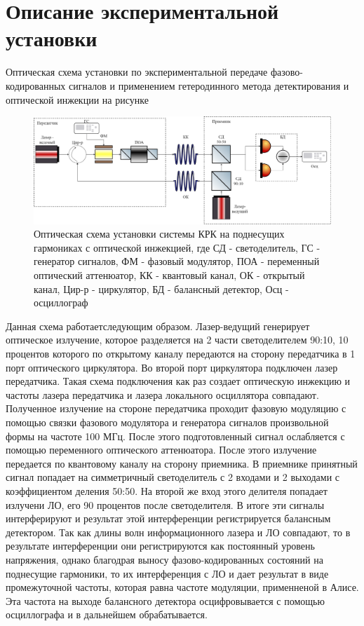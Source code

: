 \section{Описание экспериментальной установки}\label{sec:ch2/sect5}
Оптическая схема установки по экспериментальной передаче фазово-кодированных сигналов и применением гетеродинного метода детектирования и оптической инжекции на рисунке 
\begin{figure}
    \centering
    \includegraphics[width=\linewidth]{images/Схема с обратной связью новая 2 .png}
    \caption{Оптическая схема установки системы КРК на поднесущих гармониках с оптической инжекцией, где СД - светоделитель, ГС - генератор сигналов, ФМ - фазовый модулятор, ПОА - переменный оптический аттенюатор, КК - квантовый канал, ОК - открытый канал, Цир-р - циркулятор, БД - балансный детектор, Осц - осциллограф}
    \label{fig:feedback scheme ch2}
\end{figure}
Данная схема работаетследующим образом. Лазер-ведущий генерирует оптическое излучение, которое разделяется на 2 части светоделителем 90:10, 10 процентов которого по открытому каналу передаются на сторону передатчика в 1 порт оптического циркулятора. Во второй порт циркулятора подключен лазер передатчика. Такая схема подключения как раз создает оптическую инжекцию и частоты лазера передатчика и лазера локального осциллятора совпадают. Полученное излучение на стороне передатчика проходит фазовую модуляцию с помощью связки фазового модулятора и генератора сигналов произвольной формы на частоте 100 МГц. После этого подготовленный сигнал ослабляется с помощью переменного оптического аттенюатора. После этого излучение передается по квантовому каналу на сторону приемника. В приемнике принятный сигнал попадает на симметричный светоделитель с 2 входами и 2 выходами с коэффициентом деления 50:50. На второй же вход этого делителя попадает излучени ЛО, его 90 процентов после светоделителя. В итоге эти сигналы интерферируют и результат этой интерференции регистрируется балансным детектором. Так как длины волн информационного лазера и ЛО совпадают, то в результате интерференции они регистрируются как постоянный уровень напряжения, однако благодрая выносу фазово-кодированных состояний на поднесущие гармоники, то их интерференция с ЛО и дает результат в виде промежуточной частоты, которая равна частоте модуляции, применненой в Алисе. Эта частота на выходе балансного детектора осцифровывается с помощью осциллографа и в дальнейшем обрабатывается. 
